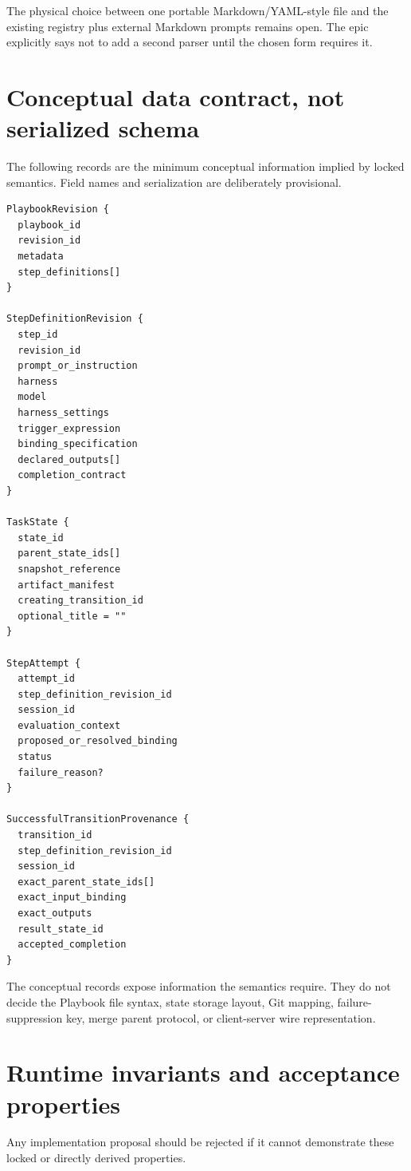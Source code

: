 \documentclass[11pt]{article}
\begin{document}
The physical choice between one portable Markdown/YAML-style file and the existing registry plus external Markdown prompts remains open. The epic explicitly says not to add a second parser until the chosen form requires it.

\section{Conceptual data contract, not serialized schema}

The following records are the minimum conceptual information implied by locked semantics. Field names and serialization are deliberately provisional.

\begin{lstlisting}[style=playbook]
PlaybookRevision {
  playbook_id
  revision_id
  metadata
  step_definitions[]
}

StepDefinitionRevision {
  step_id
  revision_id
  prompt_or_instruction
  harness
  model
  harness_settings
  trigger_expression
  binding_specification
  declared_outputs[]
  completion_contract
}

TaskState {
  state_id
  parent_state_ids[]
  snapshot_reference
  artifact_manifest
  creating_transition_id
  optional_title = ""
}

StepAttempt {
  attempt_id
  step_definition_revision_id
  session_id
  evaluation_context
  proposed_or_resolved_binding
  status
  failure_reason?
}

SuccessfulTransitionProvenance {
  transition_id
  step_definition_revision_id
  session_id
  exact_parent_state_ids[]
  exact_input_binding
  exact_outputs
  result_state_id
  accepted_completion
}
\end{lstlisting}

\begin{warningbox}
The conceptual records expose information the semantics require. They do not decide the Playbook file syntax, state storage layout, Git mapping, failure-suppression key, merge parent protocol, or client-server wire representation.
\end{warningbox}

\section{Runtime invariants and acceptance properties}

Any implementation proposal should be rejected if it cannot demonstrate these locked or directly derived properties.
\end{document}
